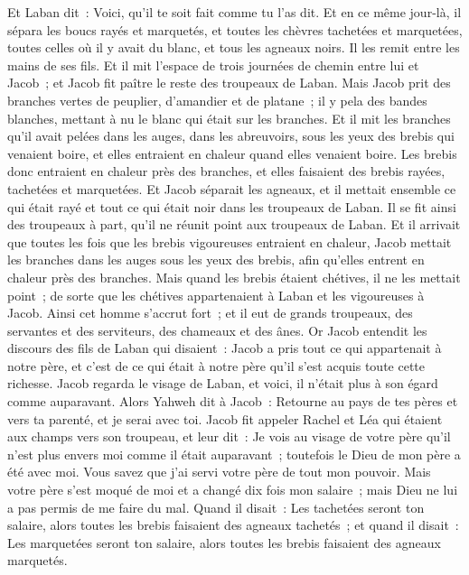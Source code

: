 \begin{multicols}{2}
Et Laban dit~: Voici, qu'il te soit fait comme tu l'as dit.
Et en ce même jour-là, il sépara les boucs rayés et marquetés, et toutes les chèvres tachetées et marquetées, toutes celles où il y avait du blanc, et tous les agneaux noirs. Il les remit entre les mains de ses fils.
Et il mit l'espace de trois journées de chemin entre lui et Jacob~; et Jacob fit paître le reste des troupeaux de Laban.
Mais Jacob prit des branches vertes de peuplier, d'amandier et de platane~; il y pela des bandes blanches, mettant à nu le blanc qui était sur les branches.
Et il mit les branches qu'il avait pelées dans les auges, dans les abreuvoirs, sous les yeux des brebis qui venaient boire, et elles entraient en chaleur quand elles venaient boire.
Les brebis donc entraient en chaleur près des branches, et elles faisaient des brebis rayées, tachetées et marquetées.
Et Jacob séparait les agneaux, et il mettait ensemble ce qui était rayé et tout ce qui était noir dans les troupeaux de Laban. Il se fit ainsi des troupeaux à part, qu'il ne réunit point aux troupeaux de Laban.
Et il arrivait que toutes les fois que les brebis vigoureuses entraient en chaleur, Jacob mettait les branches dans les auges sous les yeux des brebis, afin qu'elles entrent en chaleur près des branches.
Mais quand les brebis étaient chétives, il ne les mettait point~; de sorte que les chétives appartenaient à Laban et les vigoureuses à Jacob.
Ainsi cet homme s'accrut fort~; et il eut de grands troupeaux, des servantes et des serviteurs, des chameaux et des ânes.
\VerseOne{}Or Jacob entendit les discours des fils de Laban qui disaient~: Jacob a pris tout ce qui appartenait à notre père, et c'est de ce qui était à notre père qu'il s'est acquis toute cette richesse.
Jacob regarda le visage de Laban, et voici, il n'était plus à son égard comme auparavant.
Alors Yahweh dit à Jacob~: Retourne au pays de tes pères et vers ta parenté, et je serai avec toi.
Jacob fit appeler Rachel et Léa qui étaient aux champs vers son troupeau,
et leur dit~: Je vois au visage de votre père qu'il n'est plus envers moi comme il était auparavant~; toutefois le Dieu de mon père a été avec moi.
Vous savez que j'ai servi votre père de tout mon pouvoir.
Mais votre père s'est moqué de moi et a changé dix fois mon salaire~; mais Dieu ne lui a pas permis de me faire du mal.
Quand il disait~: Les tachetées seront ton salaire, alors toutes les brebis faisaient des agneaux tachetés~; et quand il disait~: Les marquetées seront ton salaire, alors toutes les brebis faisaient des agneaux marquetés.

\end{multicols}
